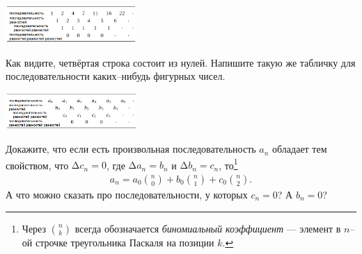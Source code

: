 \documentclass[10pt]{scrbook} \usepackage{modules/nonstahp_book}
\begin{document}
\begin{itemize}
\begin{center}
\includegraphics[width=5cm]{PizzaC1.png}
\end{center}
Как видите, четвёртая строка состоит из нулей. Напишите такую же табличку для последовательности каких--нибудь фигурных чисел. 
\begin{center}
\includegraphics[width=5cm]{PizzaC2.png}
\end{center}
Докажите, что если есть произвольная последовательность $a_n$ обладает тем свойством, что $\text{Δ} c_n = 0$, где $\text{Δ} a_n = b_n$ и $\text{Δ} b_n = c_n$, то\footnote{Через $\binom{n}{k}$ всегда обозначается {\it биномиальный коэффициент} --- элемент в $n$--ой строчке треугольника Паскаля на позиции $k$.}
\begin{align*}
a_n = a_0 \binom{n}{0} + b_0 \binom{n}{1} + c_0 \binom{n}{2}.
\end{align*}
А что можно сказать про последовательности, у которых $c_n = 0$? А $b_n = 0$?
\end{itemize}


\end{document}
